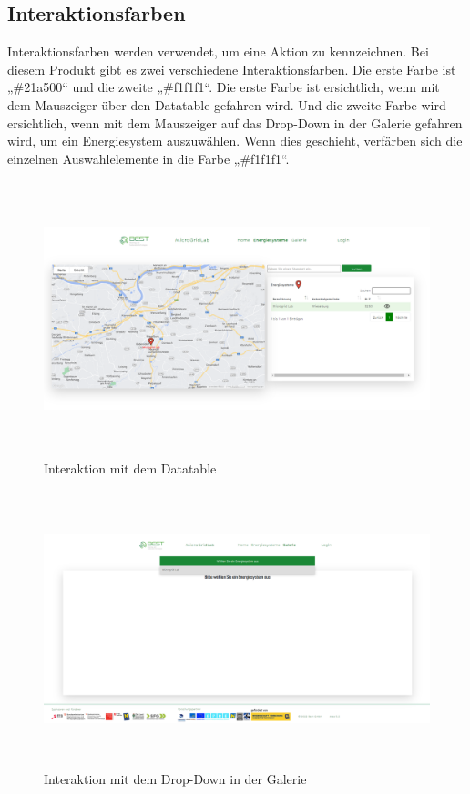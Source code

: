 \subsection{Interaktionsfarben}
Interaktionsfarben werden verwendet, um eine Aktion zu kennzeichnen. Bei diesem  Produkt gibt es zwei verschiedene Interaktionsfarben. Die erste Farbe ist „\#21a500“ und die zweite „\#f1f1f1“. Die erste Farbe ist ersichtlich, wenn mit dem Mauszeiger über den Datatable gefahren wird. Und die zweite Farbe wird ersichtlich, wenn mit dem Mauszeiger auf das Drop-Down in der Galerie gefahren wird, um ein Energiesystem auszuwählen. Wenn dies geschieht, verfärben sich die einzelnen Auswahlelemente in die Farbe „\#f1f1f1“. 
\begin{figure}[h]
	\centering
	\includegraphics[height=8cm,width=15cm]{images/InteraktionDataTable}
	\caption{Interaktion mit dem Datatable}
	\label{fig: Interaktion mit dem Datatabel}
\end{figure}
\begin{figure}[h]
	\centering
	\includegraphics[height=8cm,width=15cm]{images/InteraktionDropDown}
	\caption{Interaktion mit dem Drop-Down in der Galerie}
	\label{fig: Interaktion mit dem Datatabel}
\end{figure}

